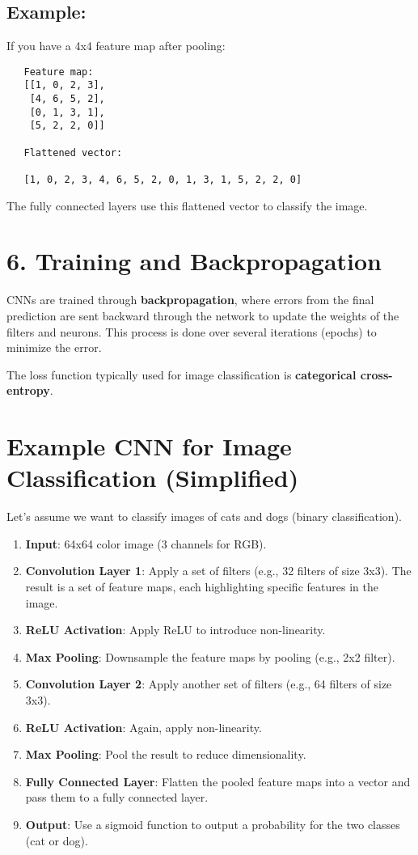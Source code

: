 \documentclass[10pt]{article}
\begin{document}
\subsection{ Example:}
If you have a 4x4 feature map after pooling:

\begin{verbatim}
   Feature map:
   [[1, 0, 2, 3],
    [4, 6, 5, 2],
    [0, 1, 3, 1],
    [5, 2, 2, 0]]
   
   Flattened vector: 
   
   [1, 0, 2, 3, 4, 6, 5, 2, 0, 1, 3, 1, 5, 2, 2, 0]
\end{verbatim}

The fully connected layers use this flattened vector to classify the image.

\section{ 6. {\bf Training and Backpropagation}}
CNNs are trained through {\bf backpropagation}, where errors from the final prediction are sent backward through the network to update the weights of the filters and neurons. This process is done over several iterations (epochs) to minimize the error.

The loss function typically used for image classification is {\bf categorical cross-entropy}.

\section{Example CNN for Image Classification (Simplified)}
Let's assume we want to classify images of cats and dogs (binary classification).

\begin{enumerate}
   \item {\bf Input}: 64x64 color image (3 channels for RGB).
   \item {\bf Convolution Layer 1}: Apply a set of filters (e.g., 32 filters of size 3x3). The result is a set of feature maps, each highlighting specific features in the image.
   \item {\bf ReLU Activation}: Apply ReLU to introduce non-linearity.
   \item {\bf Max Pooling}: Downsample the feature maps by pooling (e.g., 2x2 filter).
   \item {\bf Convolution Layer 2}: Apply another set of filters (e.g., 64 filters of size 3x3).
   \item {\bf ReLU Activation}: Again, apply non-linearity.
   \item {\bf Max Pooling}: Pool the result to reduce dimensionality.
   \item {\bf Fully Connected Layer}: Flatten the pooled feature maps into a vector and pass them to a fully connected layer.
   \item {\bf Output}: Use a sigmoid function to output a probability for the two classes (cat or dog).
\end{enumerate}
\end{document}
